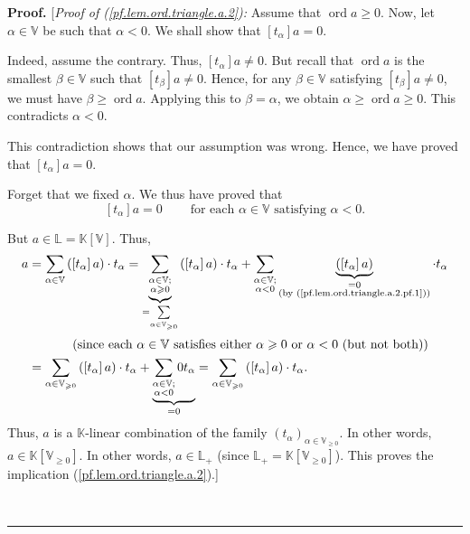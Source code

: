 \documentclass[numbers=enddot,12pt,final,onecolumn,notitlepage]{scrartcl}%
\theoremstyle{definition}
\newenvironment{proof}[1][Proof]{\noindent\textbf{#1.} }{\ \rule{0.5em}{0.5em}}
\let\sumnonlimits\sum
\renewcommand{\sum}{\sumnonlimits\limits}
\renewcommand{\geq}{\geqslant}
\theoremstyle{plainsl}
\begin{document}
\begin{proof}
[\textit{Proof of (\ref{pf.lem.ord.triangle.a.2}):} Assume that
$\operatorname*{ord}a\geq0$. Now, let $\alpha\in\mathbb{V}$ be such that
$\alpha<0$. We shall show that $\left[  t_{\alpha}\right]  a=0$.

Indeed, assume the contrary. Thus, $\left[  t_{\alpha}\right]  a\neq0$. But
recall that $\operatorname*{ord}a$ is the smallest $\beta\in\mathbb{V}$ such
that $\left[  t_{\beta}\right]  a\neq0$. Hence, for any $\beta\in\mathbb{V}$
satisfying $\left[  t_{\beta}\right]  a\neq0$, we must have $\beta
\geq\operatorname*{ord}a$. Applying this to $\beta=\alpha$, we obtain
$\alpha\geq\operatorname*{ord}a\geq0$. This contradicts $\alpha<0$.

This contradiction shows that our assumption was wrong. Hence, we have proved
that $\left[  t_{\alpha}\right]  a=0$.

Forget that we fixed $\alpha$. We thus have proved that
\begin{equation}
\left[  t_{\alpha}\right]  a=0\ \ \ \ \ \ \ \ \ \ \text{for each }\alpha
\in\mathbb{V}\text{ satisfying }\alpha<0. \label{pf.lem.ord.triangle.a.2.pf.1}%
\end{equation}


But $a\in\mathbb{L}=\mathbb{K}\left[  \mathbb{V}\right]  $. Thus,
\begin{align*}
a  &  =\sum_{\alpha\in\mathbb{V}}\left(  \left[  t_{\alpha}\right]  a\right)
\cdot t_{\alpha}=\underbrace{\sum_{\substack{\alpha\in\mathbb{V};\\\alpha
\geq0}}}_{=\sum_{\alpha\in\mathbb{V}_{\geq0}}}\left(  \left[  t_{\alpha
}\right]  a\right)  \cdot t_{\alpha}+\sum_{\substack{\alpha\in\mathbb{V}%
;\\\alpha<0}}\underbrace{\left(  \left[  t_{\alpha}\right]  a\right)
}_{\substack{=0\\\text{(by (\ref{pf.lem.ord.triangle.a.2.pf.1}))}}}\cdot
t_{\alpha}\\
&  \ \ \ \ \ \ \ \ \ \ \left(  \text{since each }\alpha\in\mathbb{V}\text{
satisfies either }\alpha\geq0\text{ or }\alpha<0\text{ (but not both)}\right)
\\
&  =\sum_{\alpha\in\mathbb{V}_{\geq0}}\left(  \left[  t_{\alpha}\right]
a\right)  \cdot t_{\alpha}+\underbrace{\sum_{\substack{\alpha\in
\mathbb{V};\\\alpha<0}}0t_{\alpha}}_{=0}=\sum_{\alpha\in\mathbb{V}_{\geq0}%
}\left(  \left[  t_{\alpha}\right]  a\right)  \cdot t_{\alpha}.
\end{align*}
Thus, $a$ is a $\mathbb{K}$-linear combination of the family $\left(
t_{\alpha}\right)  _{\alpha\in\mathbb{V}_{\geq0}}$. In other words,
$a\in\mathbb{K}\left[  \mathbb{V}_{\geq0}\right]  $. In other words,
$a\in\mathbb{L}_{+}$ (since $\mathbb{L}_{+}=\mathbb{K}\left[  \mathbb{V}%
_{\geq0}\right]  $). This proves the implication
(\ref{pf.lem.ord.triangle.a.2}).]


\end{proof}
\end{document}
